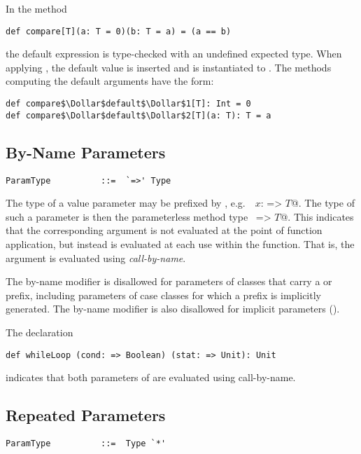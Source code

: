 \example In the method
\begin{lstlisting}
def compare[T](a: T = 0)(b: T = a) = (a == b)
\end{lstlisting}
the default expression  is type-checked with an undefined expected
type. When applying , the default value  is inserted
and  is instantiated to . The methods computing the default
arguments have the form:
\begin{lstlisting}
def compare$\Dollar$default$\Dollar$1[T]: Int = 0
def compare$\Dollar$default$\Dollar$2[T](a: T): T = a
\end{lstlisting}

\subsection{By-Name Parameters}\label{sec:by-name-params}

\syntax\begin{lstlisting} 
ParamType          ::=  `=>' Type
\end{lstlisting}

The type of a value parameter may be prefixed by \code{=>}, e.g.\
~\lstinline@$x$: => $T$@. The type of such a parameter is then the
parameterless method type ~\lstinline@=> $T$@. This indicates that the
corresponding argument is not evaluated at the point of function
application, but instead is evaluated at each use within the
function. That is, the argument is evaluated using {\em call-by-name}.

The by-name modifier is disallowed for parameters of classes that
carry a  or \code{var} prefix, including parameters of case
classes for which a \code{val} prefix is implicitly generated. The
by-name modifier is also disallowed for implicit parameters ().

\example The declaration
\begin{lstlisting}
def whileLoop (cond: => Boolean) (stat: => Unit): Unit
\end{lstlisting}
indicates that both parameters of  are evaluated using
call-by-name.

\subsection{Repeated Parameters}\label{sec:repeated-params}

\syntax\begin{lstlisting} 
ParamType          ::=  Type `*'
\end{lstlisting}

